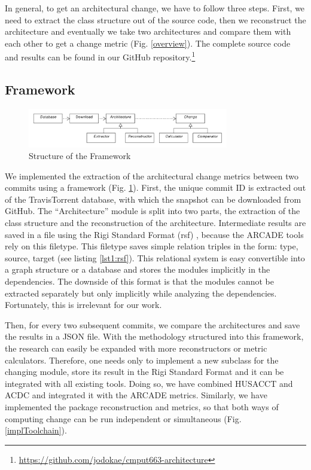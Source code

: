 \documentclass[sigplan, anonymous, review]{acmart}
\begin{document}
In general, to get an architectural change, we have to follow three steps. First, we need to extract the class structure out of the source code, then we reconstruct the architecture and eventually we take two architectures and compare them with each other to get a change metric (Fig. \ref{overview}). The complete source code and results can be found in our GitHub repository.\footnote{\url{https://github.com/jodokae/cmput663-architecture}}

\subsection{Framework}

\begin{figure}[!t]
	\centering
	\includegraphics[width=3.45in]{assets/architecture.pdf}
	\caption{Structure of the Framework}
	\label{frameworkStructure}
\end{figure}

We implemented the extraction of the architectural change metrics between two commits using a framework (Fig. \ref{frameworkStructure}). First, the unique commit ID is extracted out of the TravisTorrent database, with which the snapshot can be downloaded from GitHub. 
The ``Architecture'' module is split into two parts, the extraction of the class structure and the reconstruction of the architecture. Intermediate results are saved in a file using the Rigi Standard Format (rsf) \cite{RSF}, because the ARCADE tools rely on this filetype. This filetype saves simple relation triples in the form: type, source, target (see listing \ref{lst1:rsf}). This relational system is easy convertible into a graph structure or a database and stores the modules implicitly in the dependencies. The downside of this format is that the modules cannot be extracted separately but only implicitly while analyzing the dependencies. Fortunately, this is irrelevant for our work.

Then, for every two subsequent commits, we compare the architectures and save the results in a JSON file. With the methodology structured into this framework, the research can easily be expanded with more reconstructors or metric calculators. Therefore, one needs only to implement a new subclass for the changing module, store its result in the Rigi Standard Format and it can be integrated with all existing tools. Doing so, we have combined HUSACCT and ACDC and integrated it with the ARCADE metrics. Similarly, we have implemented the package reconstruction and metrics, so that both ways of computing change can be run independent or simultaneous (Fig. \ref{implToolchain}).
\end{document}
